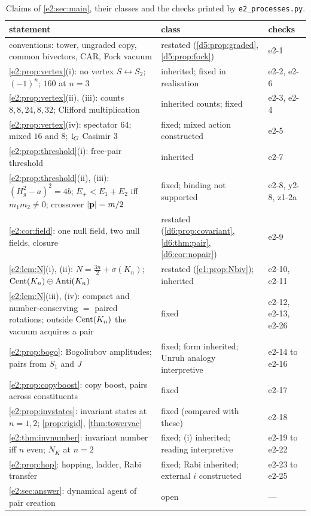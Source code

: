 \begin{table}[!htbp]
\centering
\footnotesize
\begin{tabular}{@{}>{\raggedright\arraybackslash}p{8.3cm}>{\raggedright\arraybackslash}p{4.4cm}>{\raggedright\arraybackslash}p{2.2cm}@{}}
\toprule
statement & class & checks\\
\midrule
conventions: tower, ungraded copy, common bivectors, CAR, Fock vacuum & restated (\cref{d5:prop:graded}, \cref{d5:prop:fock}) & e2-1\\
\cref{e2:prop:vertex}(i): no vertex $S\leftrightarrow S_2$; $(-1)^n$; $160$ at $n=3$ & inherited; fixed in realisation & e2-2, e2-6\\
\cref{e2:prop:vertex}(ii), (iii): counts $8,8,24,8,32$; Clifford multiplication & inherited counts; fixed & e2-3, e2-4\\
\cref{e2:prop:vertex}(iv): spectator $64$; mixed $16$ and $8$; $\mathfrak l_G$ Casimir $3$ & fixed; mixed action constructed & e2-5\\
\cref{e2:prop:threshold}(i): free-pair threshold & inherited & e2-7\\
\cref{e2:prop:threshold}(ii), (iii): $(H_g^2-a)^2=4b$; $E_+<E_1+E_2$ iff $m_1m_2\neq0$; crossover $|\mathbf p|=m/2$ & fixed; binding not supported & e2-8, y2-8, z1-2a\\
\cref{e2:cor:field}: one null field, two null fields, closure & restated (\cref{d6:prop:covariant}, \cref{d6:thm:pair}, \cref{d6:cor:nopair}) & e2-9\\
\cref{e2:lem:N}(i), (ii): $N=\tfrac{3n}2+\sigma(K_n)$; $\operatorname{Cent}(K_n)\oplus\mathrm{Anti}(K_n)$ & restated (\cref{e1:prop:Nbiv}); inherited & e2-10, e2-11\\
\cref{e2:lem:N}(iii), (iv): compact and number-conserving $=$ paired rotations; outside $\operatorname{Cent}(K_n)$ the vacuum acquires a pair & fixed & e2-12, e2-13, e2-26\\
\cref{e2:prop:bogo}: Bogoliubov amplitudes; pairs from $S_1$ and $J$ & fixed; form inherited; Unruh analogy interpretive & e2-14 to e2-16\\
\cref{e2:prop:copyboost}: copy boost, pairs across constituents & fixed & e2-17\\
\cref{e2:prop:invstates}: invariant states at $n=1,2$; \cref{prop:rigid}, \cref{thm:towervac} & fixed (compared with these) & e2-18\\
\cref{e2:thm:invnumber}: invariant number iff $n$ even; $N_K$ at $n=2$ & fixed; (i) inherited; reading interpretive & e2-19 to e2-22\\
\cref{e2:prop:hop}: hopping, ladder, Rabi transfer & fixed; Rabi inherited; external $i$ constructed & e2-23 to e2-25\\
\cref{e2:sec:answer}: dynamical agent of pair creation & open & ---\\
\bottomrule
\end{tabular}
\caption{Claims of \cref{e2:sec:main}, their classes and the checks printed by \texttt{e2\_processes.py}.}
\label{e2:tab:claims}
\end{table}

